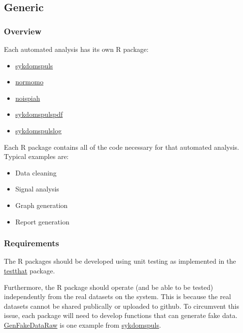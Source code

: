 \documentclass[12pt,]{article}
\providecommand{\tightlist}{%
  \setlength{\itemsep}{0pt}\setlength{\parskip}{0pt}}
\begin{document}
\subsection{Generic}\label{generic}

\subsubsection{Overview}\label{overview}

Each automated analysis has its own R package:

\begin{itemize}
\tightlist
\item
  \href{https://folkehelseinstituttet.github.io/dashboards_sykdomspuls/}{sykdomspuls}
\item
  \href{https://folkehelseinstituttet.github.io/dashboards_normomo/}{normomo}
\item
  \href{https://folkehelseinstituttet.github.io/dashboards_noispiah/}{noispiah}
\item
  \href{https://folkehelseinstituttet.github.io/dashboards_sykdomspuls_pdf/}{sykdomspulspdf}
\item
  \href{https://folkehelseinstituttet.github.io/dashboards_sykdomspuls_log/}{sykdomspulslog}
\end{itemize}

Each R package contains all of the code necessary for that automated
analysis. Typical examples are:

\begin{itemize}
\tightlist
\item
  Data cleaning
\item
  Signal analysis
\item
  Graph generation
\item
  Report generation
\end{itemize}

\subsubsection{Requirements}\label{requirements}

The R packages should be developed using unit testing as implemented in
the \href{http://r-pkgs.had.co.nz/tests.html}{testthat} package.

Furthermore, the R package should operate (and be able to be tested)
independently from the real datasets on the system. This is because the
real datasets cannot be shared publically or uploaded to github. To
circumvent this issue, each package will need to develop functions that
can generate fake data.
\href{https://folkehelseinstituttet.github.io/dashboards_sykdomspuls/reference/GenFakeDataRaw.html}{GenFakeDataRaw}
is one example from
\href{https://folkehelseinstituttet.github.io/dashboards_sykdomspuls/}{sykdomspuls}.
\end{document}
